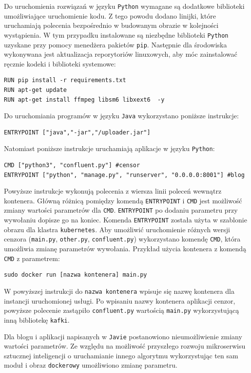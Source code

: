 \documentclass[12pt,twoside]{article}
\begin{document}
Do uruchomienia rozwiązań w języku \texttt{Python} wymagane są dodatkowe biblioteki umożliwiające uruchomienie kodu. Z tego powodu dodano linijki, które uruchamiają polecenia bezpośrednio w budowanym obrazie w kolejności wystąpienia. W tym przypadku instalowane są niezbędne biblioteki \texttt{Python} uzyskane przy pomocy menedżera pakietów \texttt{pip}. Następnie dla środowiska wykonywana jest aktualizacja reporytoriów linuxowych, aby móc zainstalować ręcznie kodeki i biblioteki systemowe:
\begin{lstlisting}
RUN pip install -r requirements.txt
RUN apt-get update
RUN apt-get install ffmpeg libsm6 libxext6  -y
\end{lstlisting}
Do uruchomiania programów w języku \texttt{Java} wykorzystano poniższe instrukcje:
\begin{lstlisting}
ENTRYPOINT ["java","-jar","/uploader.jar"]
\end{lstlisting}
Natomiast poniższe instrukcje uruchamiają aplikacje w języku \texttt{Python}:
\begin{lstlisting}
CMD ["python3", "confluent.py"] #censor
ENTRYPOINT ["python", "manage.py", "runserver", "0.0.0.0:8001"] #blog
\end{lstlisting}
Powyższe instrukcje wykonują polecenia z wiersza linii poleceń wewnątrz kontenera. Główną różnicą pomiędzy komendą \texttt{ENTRYPOINT} i \texttt{CMD} jest możliwość zmiany wartości parametrów dla \texttt{CMD}. \texttt{ENTRYPOINT} po dodaniu parametru przy wywołaniu dopisze go na koniec. Komenda \texttt{ENTRYPOINT} została użyta w szablonie obrazu dla klastra \texttt{kubernetes}. Aby umożliwić uruchomienie różnych wersji cenzora (\texttt{main.py}, \texttt{other.py}, \texttt{confluent.py}) wykorzystano komendę \texttt{CMD}, która umożliwia zmianę parametrów wywołania. Przykład użycia kontenera z komendą \texttt{CMD} z parametrem:
\begin{lstlisting}
sudo docker run [nazwa kontenera] main.py
\end{lstlisting}
W powyższej instrukcji do \texttt{nazwa kontenera} wpisuje się nazwę kontenera dla instancji uruchomionej usługi. Po wpisaniu nazwy kontenera aplikacji cenzor, powyższe polecenie zastąpiło \texttt{confluent.py} wartością \texttt{main.py} wykorzystującą inną bibliotekę \texttt{kafki}.

Dla blogu i aplikacji napisanych w \texttt{Javie} postanowiono nieumożliwienie zmiany wartości parametrów. Ze względu na możliwość przyszłego rozwoju mikroserwisu sztucznej inteligencji o uruchamianie innego algorytmu wykorzystując ten sam moduł i obraz \texttt{dockerowy} umożliwiono zmianę parametru.
\end{document}
